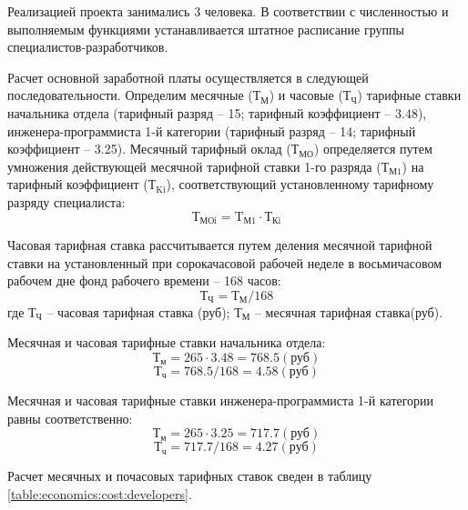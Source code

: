Реализацией проекта занимались 3 человека. В соответствии с численностью и выполняемым функциями устанавливается штатное расписание \linebreak группы специалистов-разработчиков.

Расчет основной заработной платы осуществляется в следующей последовательности. Определим месячные (${\text{Т}}_{\text{М}}$) и часовые (${\text{Т}}_{\text{Ч}}$) тарифные ставки начальника отдела (тарифный разряд -- 15; тарифный коэффициент – 3.48), инженера-программиста 1-й категории (тарифный разряд -- 14; тарифный коэффициент -- 3.25). Месячный тарифный оклад (${\text{Т}}_{\text{МО}}$) определяется путем умножения действующей месячной тарифной ставки 1-го разряда (${\text{Т}}_{\text{М1}}$) на тарифный коэффициент (${\text{Т}}_{\text{Ki}}$), соответствующий установленному тарифному разряду специалиста:
\begin{equation}
\label{formula:economics:cost:f_tmoi}
{\text{Т}}_{\text{МОi}} = {\text{T}}_{\text{М1}} \cdot {\text{Т}}_{\text{Кi}}
\end{equation}

Часовая тарифная ставка рассчитывается путем деления месячной тарифной ставки на установленный при сорокачасовой рабочей неделе в восьмичасовом рабочем дне фонд рабочего времени – 168 часов:
\begin{equation}
\label{formula:economics:cost:f_chts}
{\text{Т}}_{\text{Ч}} = {\text{Т}}_{\text{М}} / 168
\end{equation}
где ${\text{Т}}_{\text{Ч}}$ -- часовая тарифная ставка (руб); ${\text{Т}}_{\text{М}}$ -- месячная тарифная ставка(руб).

Месячная и часовая тарифные ставки начальника отдела:
$${\text{Т}}_{\text{м}} = 265 \cdot 3.48 = 768.5 (\text{руб})$$
$${\text{Т}}_{\text{ч}} = 768.5 / 168 = 4.58 (\text{руб})$$

Месячная и часовая тарифные ставки инженера-программиста 1-й категории равны соответственно:
$${\text{Т}}_{\text{м}} = 265 \cdot 3.25 = 717.7 (\text{руб})$$
$${\text{Т}}_{\text{ч}} = 717.7 / 168 = 4.27 (\text{руб})$$

Расчет месячных и почасовых тарифных ставок сведен в таблицу \ref{table:economics:cost:developers}.

